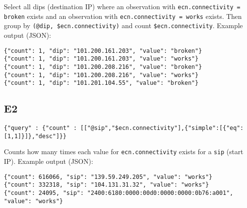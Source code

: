 \documentclass[12pt]{article}
\begin{document}
Select all dips (destination IP) where an observation with \verb|ecn.connectivity = broken| exists and an observation with \verb|ecn.connectivity = works| exists. 
Then group by \verb|(@dip, $ecn.connectivity)| and count \verb|$ecn.connectivity|. Example output (JSON):

\tiny\begin{verbatim}
{"count": 1, "dip": "101.200.161.203", "value": "broken"}
{"count": 1, "dip": "101.200.161.203", "value": "works"}
{"count": 1, "dip": "101.200.208.216", "value": "broken"}
{"count": 1, "dip": "101.200.208.216", "value": "works"}
{"count": 1, "dip": "101.201.104.55", "value": "broken"}
\end{verbatim}\normalsize

\subsection{E2}

\tiny\begin{verbatim}
{"query" : {"count" : [["@sip","$ecn.connectivity"],{"simple":[{"eq":[1,1]}]},"desc"]}}
\end{verbatim}\normalsize

Counts how many times each value for \verb|ecn.connectivity| exists for a \verb|sip| (start IP). Example output (JSON):

\tiny\begin{verbatim}
{"count": 616066, "sip": "139.59.249.205", "value": "works"}
{"count": 332318, "sip": "104.131.31.32", "value": "works"}
{"count": 24095, "sip": "2400:6180:0000:00d0:0000:0000:0b76:a001", "value": "works"}
\end{verbatim}\normalsize
\end{document}
